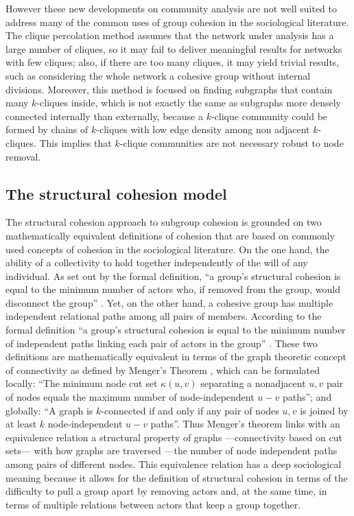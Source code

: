 However these new developments on community analysis are not well suited to address many of the common uses of group cohesion in the sociological literature. The clique percolation method assumes that the network under analysis has a large number of cliques, so it may fail to deliver meaningful results for networks with few cliques; also, if there are too many cliques, it may yield trivial results, such as considering the whole network a cohesive group without internal divisions. Moreover, this method is focused on finding subgraphs that contain many $k$-cliques inside, which is not exactly the same as subgraphs more densely connected internally than externally, because a $k$-clique community could be formed by chains of $k$-cliques with low edge density among non adjacent $k$-cliques. This implies that $k$-clique communities are not necessary robust to node removal. 

\subsection{The structural cohesion model}

The structural cohesion approach to subgroup cohesion \citep{white:2001,moody:2003} is grounded on two mathematically equivalent definitions of cohesion that are based on commonly used concepts of cohesion in the sociological literature. On the one hand, the ability of a collectivity to hold together independently of the will of any individual. As set out by the formal definition, ``a group's structural cohesion is equal to the minimum number of actors who, if removed from the group, would disconnect the group'' \citep[109]{moody:2003}. Yet, on the other hand, a cohesive group has multiple independent relational paths among all pairs of members. According to the formal definition ``a group's structural cohesion is equal to the minimum number of independent paths linking each pair of actors in the group'' \citep[109]{moody:2003}. These two definitions are mathematically equivalent in terms of the graph theoretic concept of connectivity as defined by Menger's Theorem \citep[330]{white:2001}, which can be formulated locally: ``The minimum node cut set $\kappa(u,v)$ separating a nonadjacent $u,v$ pair of nodes equals the maximum number of node-independent $u-v$ paths''; and globally: ``A graph is $k$-connected if and only if any pair of nodes $u,v$ is joined by at least $k$ node-independent $u-v$ paths''. Thus Menger's theorem links with an equivalence relation a structural property of graphs ---connectivity based on cut sets--- with how graphs are traversed ---the number of node independent paths among pairs of different nodes. This equivalence relation has a deep sociological meaning because it allows for the definition of structural cohesion in terms of the difficulty to pull a group apart by removing actors and, at the same time, in terms of multiple relations between actors that keep a group together.

